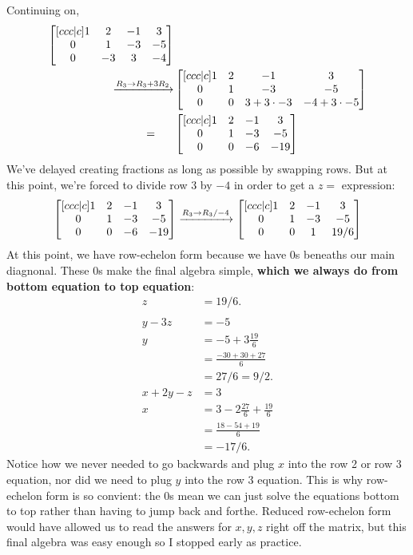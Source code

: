 \documentclass[12pt]{scrartcl}
\begin{document}
Continuing on,
\begin{align*}
    \begin{bmatrix}[ccc|c]
        1 & 2 & -1 & 3 \\
        0 & 1 & -3 & -5 \\
        0 & -3 & 3 & -4
    \end{bmatrix}&\\
    \xto[R_3 \to R_3 + 3R_2]&
    \begin{bmatrix}[ccc|c]
        1 & 2 & -1 & 3 \\
        0 & 1 & -3 & -5 \\
        0 & 0 & 3 + 3 \cdot -3 & -4 + 3 \cdot -5
    \end{bmatrix} \\
    =\quad\:\:\:&
    \begin{bmatrix}[ccc|c]
        1 & 2 & -1 & 3 \\
        0 & 1 & -3 & -5 \\
        0 & 0 & -6 & -19
    \end{bmatrix}
\end{align*}
We've delayed creating fractions as long as possible by swapping rows. But at this point, we're forced to divide row 3 by $-4$ in order to get a $z =$ expression:
\[
    \begin{bmatrix}[ccc|c]
        1 & 2 & -1 & 3 \\
        0 & 1 & -3 & -5 \\
        0 & 0 & -6 & -19
    \end{bmatrix}
    \xto[R_3 \to R_3/-4]
    \begin{bmatrix}[ccc|c]
        1 & 2 & -1 & 3 \\
        0 & 1 & -3 & -5 \\
        0 & 0 & 1 & 19/6
    \end{bmatrix}
\]
At this point, we have row-echelon form because we have 0s beneaths our main diagnonal. These 0s make the final algebra simple, \textbf{which we always do from bottom equation to top equation}:
\begin{align*}
    z &= 19/6. \\
    \\
    y - 3z &= -5 \\
    y &= -5 + 3\frac{19}{6}\\
    &= \frac{-30 + 30 + 27}{6}\\
    &= 27/6 = 9/2.
    \\
    x  + 2y - z &= 3 \\
    x &= 3 - 2\frac{27}{6} + \frac{19}{6} \\
    &= \frac{18 - 54 + 19}{6} \\
    &= -17/6.
\end{align*}
Notice how we never needed to go backwards and plug $x$ into the row 2 or row 3 equation, nor did we need to plug $y$ into the row 3 equation. This is why row-echelon form is so convient: the 0s mean we can just solve the equations bottom to top rather than having to jump back and forthe. Reduced row-echelon form would have allowed us to read the answers for $x,y,z$ right off the matrix, but this final algebra was easy enough so I stopped early as practice.
\end{document}
